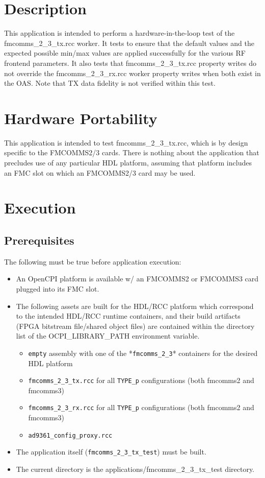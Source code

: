 \section{Description}
This application is intended to perform a hardware-in-the-loop test of the fmcomms\_2\_3\_tx.rcc worker. It tests to ensure that the default values and the expected possible min/max values are applied successfully for the various RF frontend parameters. It also tests that fmcomms\_2\_3\_tx.rcc property writes do not override the fmcomms\_2\_3\_rx.rcc worker property writes when both exist in the OAS. Note that TX data fidelity is not verified within this test.

\section{Hardware Portability}
This application is intended to test fmcomms\_2\_3\_tx.rcc, which is by design specific to the FMCOMMS2/3 cards. There is nothing about the application that precludes use of any particular HDL platform, assuming that platform includes an FMC slot on which an FMCOMMS2/3 card may be used.

\section{Execution}
\subsection{Prerequisites}
The following must be true before application execution:
\begin{itemize}
  \item An OpenCPI platform is available w/ an FMCOMMS2 or FMCOMMS3 card plugged into its FMC slot.
  \item The following assets are built for the HDL/RCC platform which correspond to the intended HDL/RCC runtime containers, and their build artifacts (FPGA bitstream file/shared object files) are contained within the directory list of the OCPI\_LIBRARY\_PATH environment variable.
  \begin{itemize}
    \item \verb+empty+ assembly with one of the *\verb+fmcomms_2_3+* containers for the desired HDL platform
    \item \verb+fmcomms_2_3_tx.rcc+ for all \verb+TYPE_p+ configurations (both fmcomms2 and fmcomms3)
    \item \verb+fmcomms_2_3_rx.rcc+ for all \verb+TYPE_p+ configurations (both fmcomms2 and fmcomms3)
    \item \verb+ad9361_config_proxy.rcc+
  \end{itemize}
  \item The application itself (\verb+fmcomms_2_3_tx_test+) must be built.
  \item The current directory is the applications/fmcomms\_2\_3\_tx\_test directory.
\end{itemize}
